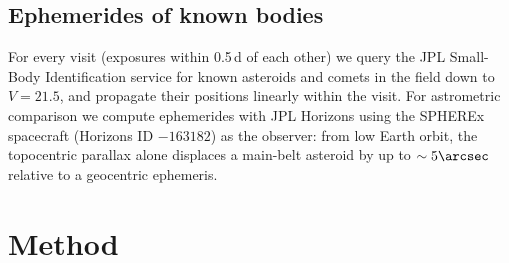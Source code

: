 \documentclass[twocolumn,linenumbers]{aastex702}
\begin{document}
\subsection{Ephemerides of known bodies}
For every visit (exposures within 0.5\,d of each other) we query the JPL Small-Body Identification service for known asteroids and comets in the field down to $V = 21.5$, and propagate their positions linearly within the visit. For astrometric comparison we compute ephemerides with JPL Horizons \citep{giorgini96} using the SPHEREx spacecraft (Horizons ID $-163182$) as the observer: from low Earth orbit, the topocentric parallax alone displaces a main-belt asteroid by up to $\sim 5\arcsec$ relative to a geocentric ephemeris.

\section{Method}\label{sec:method}
\end{document}
